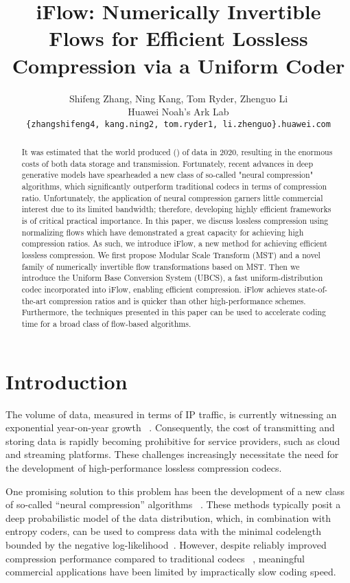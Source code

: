 \documentclass{article}
\title{iFlow: Numerically Invertible Flows for Efficient Lossless Compression via a Uniform Coder}
\author{Shifeng Zhang, Ning Kang, Tom Ryder, Zhenguo Li \\
  Huawei Noah's Ark Lab\\
  \texttt{\{zhangshifeng4, kang.ning2, tom.ryder1, li.zhenguo\}.huawei.com} \\
}
\begin{document}
\maketitle

\begin{abstract}
It was estimated that the world produced  () of data in 2020,
resulting in the enormous costs of both data storage and transmission.
Fortunately, recent advances in deep generative models have spearheaded a new class of so-called "neural compression" algorithms, which significantly outperform traditional codecs in terms of compression ratio.
Unfortunately, the application of neural compression garners little commercial interest due to its limited bandwidth; therefore, developing highly efficient frameworks is of critical practical importance. In this paper, we discuss lossless compression using normalizing flows which have demonstrated a great capacity for achieving high compression ratios.
As such, we introduce iFlow, a new method for achieving efficient lossless compression. 
We first propose Modular Scale Transform (MST) and a novel family of numerically invertible flow transformations based on MST. Then we introduce the Uniform Base Conversion System (UBCS), a fast uniform-distribution codec incorporated into iFlow, enabling efficient compression. 
iFlow achieves state-of-the-art compression ratios and is  quicker than other high-performance schemes. Furthermore, the techniques presented in this paper can be used to accelerate coding time for a broad class of flow-based algorithms. 
\end{abstract}

\section{Introduction}

The volume of data, measured in terms of IP traffic, is currently witnessing an exponential year-on-year growth ~\cite{forecast2019cisco}. Consequently, the cost of transmitting and storing data is rapidly becoming prohibitive for service providers, such as cloud and streaming platforms. These challenges increasingly necessitate the need for the development of high-performance lossless compression codecs.

One promising solution to this problem has been the development of a new class of so-called “neural compression” algorithms ~\cite{mentzer2019practical,townsend2019practical,hoogeboom2019integer,berg2020idf++,ho2019compression,townsend2019hilloc,kingma2019bit,mentzer2020learning,cao2020lossless,zhang2021ivpf}. 
These methods typically posit a deep probabilistic model of the data distribution, which, in combination with entropy coders, can be used to compress data with the minimal codelength bounded by the negative log-likelihood~\cite{mackay2003information}.
However, despite reliably improved compression performance compared to traditional codecs ~\cite{gage1994new,rabbani2002jpeg2000,collet2016smaller,roelofs1999png}, meaningful commercial applications have been limited by impractically slow coding speed.
\end{document}
